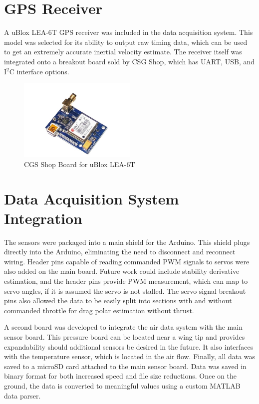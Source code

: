 \section{GPS Receiver}
A uBlox LEA-6T GPS receiver was included in the data acquisition system. This model was selected for its ability to output raw timing data, which can be used to get an extremely accurate inertial velocity estimate\cite{ubloxDemo}. The receiver itself was integrated onto a breakout board sold by CSG Shop, which has UART, USB, and I$^2$C interface options. 

\begin{figure}[H]
  \centering
    \includegraphics[width=0.5\textwidth]{figures/gpsNoBack.jpg}
  \caption{CGS Shop Board for uBlox LEA-6T} \label{gpsPicture}
\end{figure}

\section{Data Acquisition System Integration}
The sensors were packaged into a main shield for the Arduino. This shield plugs directly into the Arduino, eliminating the need to disconnect and reconnect wiring. Header pins capable of reading commanded PWM signals to servos were also added on the main board. Future work could include stability derivative estimation, and the header pins provide PWM measurement, which can map to servo angles, if it is assumed the servo is not stalled. The servo signal breakout pins also allowed the data to be easily split into sections with and without commanded throttle for drag polar estimation without thrust.

A second board was developed to integrate the air data system with the main sensor board. This pressure board can be located near a wing tip and provides expandability should additional sensors be desired in the future. It also interfaces with the temperature sensor, which is located in the air flow. Finally, all data was saved to a microSD card attached to the main sensor board. Data was saved in binary format for both increased speed and file size reductions. Once on the ground, the data is converted to meaningful values using a custom MATLAB data parser.
